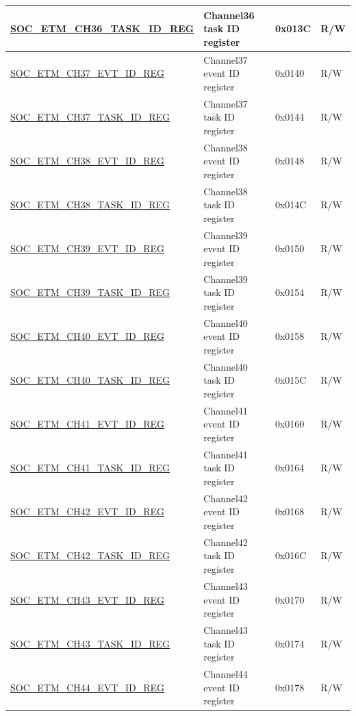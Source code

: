 \begin{longtable}{ | p{6cm} | p{6.4cm} | p{1.3cm} | p{1.8cm} | }
\hyperref[regdesc:SOCETMCH0TASKIDREG]{SOC\_ETM\_CH36\_TASK\_ID\_REG} & Channel36 task ID register & 0x013C & R/W \\ \hline
\hyperref[regdesc:SOCETMCH0EVTIDREG]{SOC\_ETM\_CH37\_EVT\_ID\_REG} & Channel37 event ID register & 0x0140 & R/W \\ \hline
\hyperref[regdesc:SOCETMCH0TASKIDREG]{SOC\_ETM\_CH37\_TASK\_ID\_REG} & Channel37 task ID register & 0x0144 & R/W \\ \hline
\hyperref[regdesc:SOCETMCH0EVTIDREG]{SOC\_ETM\_CH38\_EVT\_ID\_REG} & Channel38 event ID register & 0x0148 & R/W \\ \hline
\hyperref[regdesc:SOCETMCH0TASKIDREG]{SOC\_ETM\_CH38\_TASK\_ID\_REG} & Channel38 task ID register & 0x014C & R/W \\ \hline
\hyperref[regdesc:SOCETMCH0EVTIDREG]{SOC\_ETM\_CH39\_EVT\_ID\_REG} & Channel39 event ID register & 0x0150 & R/W \\ \hline
\hyperref[regdesc:SOCETMCH0TASKIDREG]{SOC\_ETM\_CH39\_TASK\_ID\_REG} & Channel39 task ID register & 0x0154 & R/W \\ \hline
\hyperref[regdesc:SOCETMCH0EVTIDREG]{SOC\_ETM\_CH40\_EVT\_ID\_REG} & Channel40 event ID register & 0x0158 & R/W \\ \hline
\hyperref[regdesc:SOCETMCH0TASKIDREG]{SOC\_ETM\_CH40\_TASK\_ID\_REG} & Channel40 task ID register & 0x015C & R/W \\ \hline
\hyperref[regdesc:SOCETMCH0EVTIDREG]{SOC\_ETM\_CH41\_EVT\_ID\_REG} & Channel41 event ID register & 0x0160 & R/W \\ \hline
\hyperref[regdesc:SOCETMCH0TASKIDREG]{SOC\_ETM\_CH41\_TASK\_ID\_REG} & Channel41 task ID register & 0x0164 & R/W \\ \hline
\hyperref[regdesc:SOCETMCH0EVTIDREG]{SOC\_ETM\_CH42\_EVT\_ID\_REG} & Channel42 event ID register & 0x0168 & R/W \\ \hline
\hyperref[regdesc:SOCETMCH0TASKIDREG]{SOC\_ETM\_CH42\_TASK\_ID\_REG} & Channel42 task ID register & 0x016C & R/W \\ \hline
\hyperref[regdesc:SOCETMCH0EVTIDREG]{SOC\_ETM\_CH43\_EVT\_ID\_REG} & Channel43 event ID register & 0x0170 & R/W \\ \hline
\hyperref[regdesc:SOCETMCH0TASKIDREG]{SOC\_ETM\_CH43\_TASK\_ID\_REG} & Channel43 task ID register & 0x0174 & R/W \\ \hline
\hyperref[regdesc:SOCETMCH0EVTIDREG]{SOC\_ETM\_CH44\_EVT\_ID\_REG} & Channel44 event ID register & 0x0178 & R/W \\ \hline

\end{longtable}

